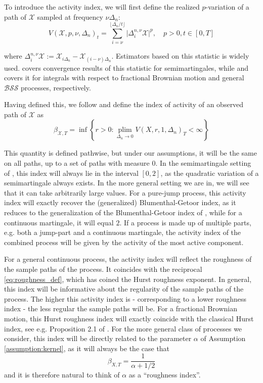 \documentclass[fleqn,11pt,letterpaper]{article}
\theoremstyle{plain}
\theoremstyle{definition}
\theoremstyle{remark}
\numberwithin{equation}{section}
\begin{document}
To introduce the activity index, we will first define the realized $p$-variation of a path of $\mathcal{X}$ sampled at frequency $\nu\Delta_n$: 
\begin{equation} \label{eq:p_variation_def}
    V(\mathcal{X},p,\nu,\Delta_n)_t=\sum_{i=\nu}^{\lfloor\Delta_n/t\rfloor}\vert\Delta_i^{n,\nu}\mathcal{X}\vert^p,\quad p>0,t\in[0,T]
\end{equation}

where $\Delta_i^{n,\nu}\mathcal{X}:=\mathcal{X}_{i\Delta_n}-\mathcal{X}_{(i-\nu)\Delta_n}$. Estimators based on this statistic is widely used. \cite{Todorov2010} covers convergence results of this statistic for semimartingales, while \cite{Corcuera2006} and \cite{Corcuera2013} covers it for integrals with respect to fractional Brownian motion and general $\mathcal{BSS}$ processes, respectively. 

Having defined this, we follow \cite{TodorovTauchen2011} and define the index of activity of an observed path of $\mathcal{X}$ as 
\begin{equation}
    \beta_{\mathcal{X},T} = \inf\left\{r>0:\underset{\Delta_n\to0}{\operatorname{plim}}V(X,r,1,\Delta_n)_T<\infty\right\}
\end{equation}

This quantity is defined pathwise, but under our assumptions, it will be the same on all paths, up to a set of paths with measure $0$. In the semimartingale setting of \cite{Todorov2010}, this index will always lie in the interval $[0,2]$, as the quadratic variation of a semimartingale always exists. In the more general setting we are in, we will see that it can take arbitrarily large values. For a pure-jump process, this activity index will exactly recover the (generalized) Blumenthal-Getoor index, as it reduces to the generalization of the Blumenthal-Getoor index of \cite{Ait-Sahalia2009a}, while for a continuous martingale, it will equal $2$. If a process is made up of multiple parts, e.g. both a jump-part and a continuous martingale, the activity index of the combined process will be given by the activity of the most active component.

For a general continuous process, the activity index will reflect the roughness of the sample paths of the process. It coincides with the reciprocal \eqref{eq:roughness_def}, which \cite{HanSchied2021} has coined the Hurst roughness exponent. In general, this index will be informative about the regularity of the sample paths of the process. The higher this activity index is - corresponding to a lower roughness index - the less regular the sample paths will be. For a fractional Brownian motion, this Hurst roughness index will exactly coincide with the classical Hurst  index, see e.g. Proposition 2.1 of \cite{Bennedsen2020}. For the more general class of processes we consider, this index will be directly related to the parameter $\alpha$ of Assumption \ref{assumption:kernel}, as it will always be the case that 
\begin{equation}
    \beta_{X,T}=\frac{1}{\alpha+1/2}
\end{equation}
and it is therefore natural to think of $\alpha$ as a ``roughness index''. 
\end{document}
